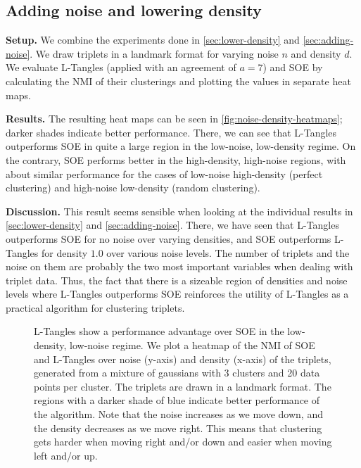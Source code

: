 \subsection{Adding noise and lowering density}
\textbf{Setup.}
We combine the experiments done in \autoref{sec:lower-density} and \autoref{sec:adding-noise}. We draw triplets in a landmark format for varying 
noise $n$ and density $d$. We evaluate L-Tangles (applied with an agreement of $a=7$) and SOE by calculating the NMI of their clusterings and plotting the values in separate heat maps. 

\textbf{Results.}
The resulting heat maps can be seen in \autoref{fig:noise-density-heatmaps}; darker shades indicate better performance.
There, we can see that L-Tangles outperforms SOE in quite a large region in the low-noise, low-density regime. 
On the contrary, SOE performs better in the high-density, high-noise regions, with about similar performance
for the cases of low-noise high-density (perfect clustering) and high-noise low-density (random clustering).

\textbf{Discussion.}
This result seems sensible when looking at the individual results in \autoref{sec:lower-density} and \autoref{sec:adding-noise}. There, we have seen that L-Tangles
outperforms SOE for no noise over varying densities, and SOE outperforms L-Tangles for density $1.0$ over various noise levels. The number of triplets and the noise on them are probably
the two most important variables when dealing with triplet data. Thus, the fact that there is a sizeable region of densities and noise levels where L-Tangles outperforms
SOE reinforces the utility of L-Tangles as a practical algorithm for clustering triplets.

\onecolumn
\begin{figure}[ht]
    \centering
    \caption{
        L-Tangles show a performance advantage over SOE in the low-density, low-noise regime. 
        We plot a heatmap of the NMI of SOE and L-Tangles over noise (y-axis) and density (x-axis) of the triplets, 
        generated from a mixture of gaussians with 3 clusters and 20 data points per cluster. The triplets are drawn in a landmark format. 
        The regions with a darker shade of blue indicate better performance of the algorithm. 
        Note that the noise increases as we move down, and the
        density decreases as we move right. This means that clustering gets harder when moving right and/or down and easier when moving left and/or up.
    }
    \label{fig:noise-density-heatmaps}
\end{figure}

